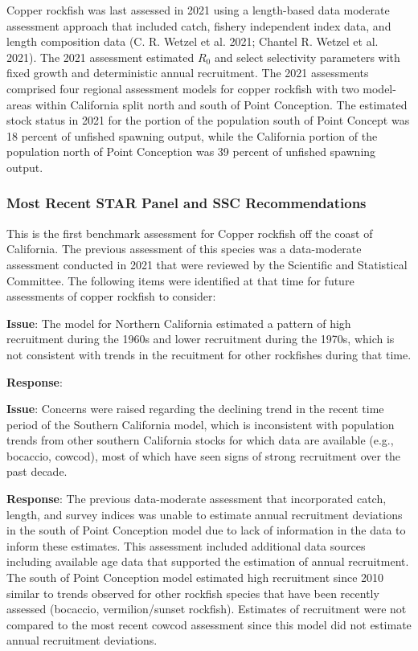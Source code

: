 \documentclass[11pt,
  english,
  letterpaper,
]{article}
\begin{document}
Copper rockfish was last assessed in 2021 using a length-based data moderate assessment approach that included catch, fishery independent index data, and length composition data (C. R. Wetzel et al. 2021; Chantel R. Wetzel et al. 2021). The 2021 assessment estimated \(R_0\) and select selectivity parameters with fixed growth and deterministic annual recruitment. The 2021 assessments comprised four regional assessment models for copper rockfish with two model-areas within California split north and south of Point Conception. The estimated stock status in 2021 for the portion of the population south of Point Concept was 18 percent of unfished spawning output, while the California portion of the population north of Point Conception was 39 percent of unfished spawning output.

\hypertarget{most-recent-star-panel-and-ssc-recommendations}{%
\subsubsection{Most Recent STAR Panel and SSC Recommendations}\label{most-recent-star-panel-and-ssc-recommendations}}

This is the first benchmark assessment for Copper rockfish off the coast of California. The previous assessment of this species was a data-moderate assessment conducted in 2021 that were reviewed by the Scientific and Statistical Committee. The following items were identified at that time for future assessments of copper rockfish to consider:

\textbf{Issue}: The model for Northern California estimated a pattern of high recruitment during the 1960s and lower recruitment during the 1970s, which is not consistent with trends in the recuitment for other rockfishes during that time.

\textbf{Response}:

\textbf{Issue}: Concerns were raised regarding the declining trend in the recent time period of the Southern California model, which is inconsistent with population trends from other southern California stocks for which data are available (e.g., bocaccio, cowcod), most of which have seen signs of strong recruitment over the past decade.

\textbf{Response}: The previous data-moderate assessment that incorporated catch, length, and survey indices was unable to estimate annual recruitment deviations in the south of Point Conception model due to lack of information in the data to inform these estimates. This assessment included additional data sources including available age data that supported the estimation of annual recruitment. The south of Point Conception model estimated high recruitment since 2010 similar to trends observed for other rockfish species that have been recently assessed (bocaccio, vermilion/sunset rockfish). Estimates of recruitment were not compared to the most recent cowcod assessment since this model did not estimate annual recruitment deviations.
\end{document}
